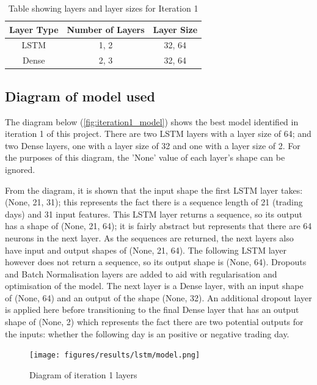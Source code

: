 \begin{table}[ht]
    \centering
    \begin{tabular}{|c|c|c|}
        \hline
        Layer Type & Number of Layers & Layer Size \\
        \hline\hline
        LSTM & 1, 2 & 32, 64 \\
        Dense & 2, 3 & 32, 64 \\
        \hline
    \end{tabular}
    \caption{Table showing layers and layer sizes for Iteration 1}
    \label{tab:iteration1_layers}
\end{table}
\FloatBarrier

\subsection{Diagram of model used}
The diagram below (\autoref{fig:iteration1_model}) shows the best model identified in iteration 1 of this project.
There are two LSTM layers with a layer size of 64; and two Dense layers, one with a layer size of 32 and one with
a layer size of 2. For the purposes of this diagram, the 'None' value of each layer's shape can be ignored.

From the diagram, it is shown that the input shape the first LSTM layer takes: (None, 21, 31); this represents the
fact there is a sequence length of 21 (trading days) and 31 input features.  This LSTM layer returns a sequence, so its
output has a shape of (None, 21, 64); it is fairly abstract but represents that there are 64 neurons in the next layer.
As the sequences are returned, the next layers also have input and output shapes of (None, 21, 64). The following LSTM
layer however does not return a sequence, so its output shape is (None, 64).
Dropouts and Batch Normalisation layers are added to aid with regularisation and optimisation of the model.
The next layer is a Dense layer, with an input shape of (None, 64) and an output of the shape (None, 32). An additional
dropout layer is applied here before transitioning to the final Dense layer that has an output shape of (None, 2)
which represents the fact there are two potential outputs for the inputs: whether the following day
is an positive or negative trading day.

\begin{figure}[ht]
    \centering
    \texttt{[image: figures/results/lstm/model.png]}
    \caption[Diagram of iteration 1 layers]{Diagram of iteration 1 layers}
    \label{fig:iteration1_model}
\end{figure}
\FloatBarrier

